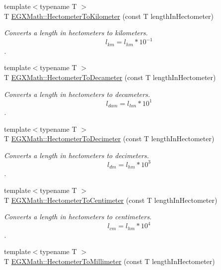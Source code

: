 \begin{DoxyCompactItemize}
{\footnotesize template$<$typename T $>$ }\\T \mbox{\hyperlink{group___e_g_x_math-_conversions-_length_conversions-_hectometer-_s_i_ga38aeefced1e25e531c306bae511786bb}{E\+G\+X\+Math\+::\+Hectometer\+To\+Kilometer}} (const T length\+In\+Hectometer)
\begin{DoxyCompactList}\small\item\em Converts a length in hectometers to kilometers. \[ l_{km}=l_{hm} * 10^{-1} \]. \end{DoxyCompactList}\item 
{\footnotesize template$<$typename T $>$ }\\T \mbox{\hyperlink{group___e_g_x_math-_conversions-_length_conversions-_hectometer-_s_i_gae1f538c996355305fea9022a6325dab0}{E\+G\+X\+Math\+::\+Hectometer\+To\+Decameter}} (const T length\+In\+Hectometer)
\begin{DoxyCompactList}\small\item\em Converts a length in hectometers to decameters. \[ l_{dam}=l_{hm} * 10^{1} \]. \end{DoxyCompactList}\item 
{\footnotesize template$<$typename T $>$ }\\T \mbox{\hyperlink{group___e_g_x_math-_conversions-_length_conversions-_hectometer-_s_i_ga41bf480cfd5b36671453de373251d171}{E\+G\+X\+Math\+::\+Hectometer\+To\+Decimeter}} (const T length\+In\+Hectometer)
\begin{DoxyCompactList}\small\item\em Converts a length in hectometers to decimeters. \[ l_{dm}=l_{hm} * 10^{3} \]. \end{DoxyCompactList}\item 
{\footnotesize template$<$typename T $>$ }\\T \mbox{\hyperlink{group___e_g_x_math-_conversions-_length_conversions-_hectometer-_s_i_gace00e5f71f5c29d8022319c3bf63745d}{E\+G\+X\+Math\+::\+Hectometer\+To\+Centimeter}} (const T length\+In\+Hectometer)
\begin{DoxyCompactList}\small\item\em Converts a length in hectometers to centimeters. \[ l_{cm}=l_{hm} * 10^{4} \]. \end{DoxyCompactList}\item 
{\footnotesize template$<$typename T $>$ }\\T \mbox{\hyperlink{group___e_g_x_math-_conversions-_length_conversions-_hectometer-_s_i_gaa4255093ded6f7cb739f3c519881c294}{E\+G\+X\+Math\+::\+Hectometer\+To\+Millimeter}} (const T length\+In\+Hectometer)

\end{DoxyCompactItemize}
